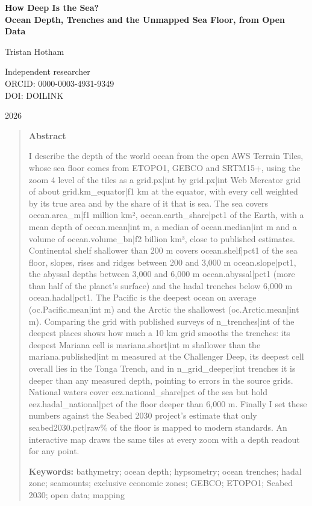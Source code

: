 \documentclass[11pt,a4paper]{article}
\begin{document}
\begin{center}
{\Large\bfseries How Deep Is the Sea?\\[2pt] Ocean Depth, Trenches and the Unmapped Sea Floor, from Open Data\par}
\vspace{1.2em}
{\large Tristan Hotham\par}
\vspace{0.3em}
{\small Independent researcher\\
ORCID: 0000-0003-4931-9349\\
DOI: {{DOILINK}}\par}
\vspace{0.8em}
2026
\end{center}

\begin{quote}
\small
\begin{center}\textbf{Abstract}\end{center}
I describe the depth of the world ocean from the open AWS Terrain Tiles, whose sea floor comes from ETOPO1, GEBCO and SRTM15+, using the zoom 4 level of the tiles as a {{grid.px|int}} by {{grid.px|int}} Web Mercator grid of about {{grid.km_equator|f1}} km at the equator, with every cell weighted by its true area and by the share of it that is sea. The sea covers {{ocean.area_m|f1}} million km², {{ocean.earth_share|pct1}} of the Earth, with a mean depth of {{ocean.mean|int}} m, a median of {{ocean.median|int}} m and a volume of {{ocean.volume_bn|f2}} billion km³, close to published estimates. Continental shelf shallower than 200 m covers {{ocean.shelf|pct1}} of the sea floor, slopes, rises and ridges between 200 and 3,000 m {{ocean.slope|pct1}}, the abyssal depths between 3,000 and 6,000 m {{ocean.abyssal|pct1}} (more than half of the planet's surface) and the hadal trenches below 6,000 m {{ocean.hadal|pct1}}. The Pacific is the deepest ocean on average ({{oc.Pacific.mean|int}} m) and the Arctic the shallowest ({{oc.Arctic.mean|int}} m). Comparing the grid with published surveys of {{n_trenches|int}} of the deepest places shows how much a 10 km grid smooths the trenches: its deepest Mariana cell is {{mariana.short|int}} m shallower than the {{mariana.published|int}} m measured at the Challenger Deep, its deepest cell overall lies in the Tonga Trench, and in {{n_grid_deeper|int}} trenches it is deeper than any measured depth, pointing to errors in the source grids. National waters cover {{eez.national_share|pct}} of the sea but hold {{eez.hadal_national|pct}} of the floor deeper than 6,000 m. Finally I set these numbers against the Seabed 2030 project's estimate that only {{seabed2030.pct|raw}}\% of the floor is mapped to modern standards. An interactive map draws the same tiles at every zoom with a depth readout for any point.

\textbf{Keywords:} bathymetry; ocean depth; hypsometry; ocean trenches; hadal zone; seamounts; exclusive economic zones; GEBCO; ETOPO1; Seabed 2030; open data; mapping
\end{quote}
\end{document}
